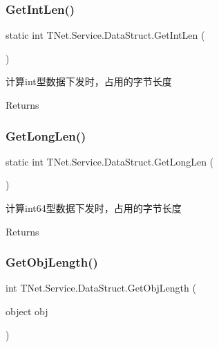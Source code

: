 \subsubsection{\texorpdfstring{Get\+Int\+Len()}{GetIntLen()}}
{\footnotesize\ttfamily static int T\+Net.\+Service.\+Data\+Struct.\+Get\+Int\+Len (\begin{DoxyParamCaption}{ }\end{DoxyParamCaption})\hspace{0.3cm}{\ttfamily [static]}}



计算int型数据下发时，占用的字节长度 

\begin{DoxyReturn}{Returns}

\end{DoxyReturn}
\mbox{\label{class_t_net_1_1_service_1_1_data_struct_a32d76c357299f05e8268db849f6e76e3}} 
\subsubsection{\texorpdfstring{Get\+Long\+Len()}{GetLongLen()}}
{\footnotesize\ttfamily static int T\+Net.\+Service.\+Data\+Struct.\+Get\+Long\+Len (\begin{DoxyParamCaption}{ }\end{DoxyParamCaption})\hspace{0.3cm}{\ttfamily [static]}}



计算int64型数据下发时，占用的字节长度 

\begin{DoxyReturn}{Returns}

\end{DoxyReturn}
\mbox{\label{class_t_net_1_1_service_1_1_data_struct_a6ba31ed446da27f6ef4851f07f95c07c}} 
\subsubsection{\texorpdfstring{Get\+Obj\+Length()}{GetObjLength()}}
{\footnotesize\ttfamily int T\+Net.\+Service.\+Data\+Struct.\+Get\+Obj\+Length (\begin{DoxyParamCaption}\item[{object}]{obj }\end{DoxyParamCaption})\hspace{0.3cm}{\ttfamily [protected]}}




